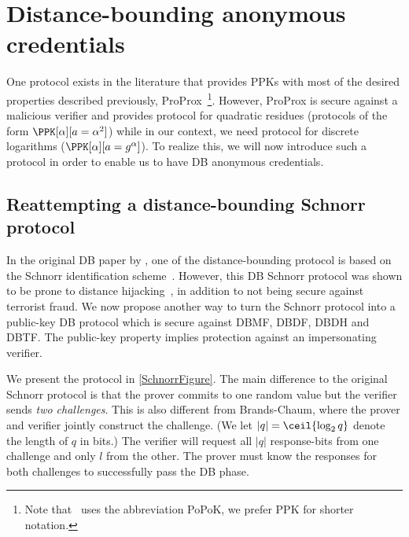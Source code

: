 \section{Distance-bounding anonymous credentials}%
\label{DB-anon-cred}

One protocol exists in the literature that provides \acp{PPK} with most of the 
desired properties described previously, ProProx~\cite{ProProx}\footnote{Note 
  that~\cite{ProProx} uses the abbreviation PoPoK, we prefer \acs{PPK} for 
  shorter notation.}.
However, ProProx is secure against a malicious verifier and provides  
protocol for quadratic residues (\ie protocols of the form \(\PPK[\alpha][a = 
  \alpha^2]\)) while in our context, we need  protocol for discrete 
logarithms (\ie \(\PPK[\alpha][a = g^\alpha]\)).
To realize this, we will now introduce such a protocol in order to enable us to have \ac{DB} anonymous credentials.

\subsection{Reattempting a distance-bounding Schnorr protocol}%
\label{DBSchnorr}

In the original \ac{DB} paper by \citet{DistanceBounding}, one of the distance-bounding protocol is based on the Schnorr identification scheme~\cite{Schnorr}.
However, this \ac{DB} Schnorr protocol was shown to be prone to distance hijacking~\cite{DistanceHijacking}, in addition to not being secure against terrorist fraud.
We now propose another way to turn the Schnorr protocol into a
public-key \ac{DB} protocol which is secure against \ac{DBMF},
\ac{DBDF}, \ac{DBDH} and \ac{DBTF}.
The public-key property implies protection against an impersonating
verifier.

We present the protocol in \cref{SchnorrFigure}.
The main difference to the original Schnorr protocol is that the prover commits 
to one random value but the verifier sends \emph{two challenges}.
This is also different from Brands-Chaum, where the prover and verifier jointly 
construct the challenge.
(We let \(|q| = \ceil{\log_2 q}\) denote the length of \(q\) in bits.)
The verifier will request all \(|q|\) response-bits from one challenge and only 
\(l\) from the other.
The prover must know the responses for both challenges to successfully pass the 
\ac{DB} phase.

